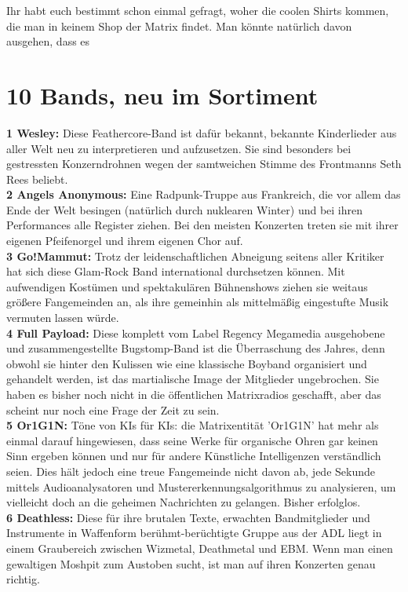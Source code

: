 \documentclass[9pt, final]{extarticle}
\begin{document}
\begin{multicols}{2}

Ihr habt euch bestimmt schon einmal gefragt, woher die coolen Shirts kommen, die man in keinem Shop der  Matrix findet. Man könnte natürlich davon ausgehen, dass es 
\section{10 Bands, neu im Sortiment}
\textbf{1 Wesley:} Diese Feathercore-Band ist dafür bekannt, bekannte Kinderlieder aus aller Welt neu zu interpretieren und aufzusetzen. Sie sind besonders bei gestressten Konzerndrohnen wegen der samtweichen Stimme des Frontmanns Seth Rees beliebt.\\
\textbf{2 Angels Anonymous:} Eine Radpunk-Truppe aus Frankreich, die vor allem  das Ende der Welt besingen (natürlich durch nuklearen Winter) und bei ihren Performances alle Register ziehen. Bei den meisten Konzerten treten sie mit ihrer eigenen Pfeifenorgel und ihrem eigenen Chor auf.\\
\textbf{3 Go!Mammut:} Trotz der leidenschaftlichen Abneigung seitens aller Kritiker hat sich diese Glam-Rock Band international durchsetzen können. Mit aufwendigen Kostümen und spektakulären Bühnenshows ziehen sie weitaus größere Fangemeinden an, als ihre gemeinhin als mittelmäßig eingestufte Musik vermuten lassen würde.\\
\textbf{4 Full Payload:} Diese komplett vom Label Regency Megamedia ausgehobene und zusammengestellte Bugstomp-Band ist die Überraschung des Jahres, denn obwohl sie hinter den Kulissen wie eine klassische Boyband organisiert und gehandelt werden, ist das martialische Image der Mitglieder ungebrochen. Sie haben es bisher noch nicht in die öffentlichen Matrixradios geschafft, aber das scheint nur noch eine Frage der Zeit zu sein.\\
\textbf{5 Or1G1N:} Töne von KIs für KIs: die Matrixentität 'Or1G1N' hat mehr als einmal darauf hingewiesen, dass seine Werke für organische Ohren gar keinen Sinn ergeben können und nur für andere Künstliche Intelligenzen verständlich seien. Dies hält jedoch eine treue Fangemeinde nicht davon ab, jede Sekunde mittels Audioanalysatoren und Mustererkennungsalgorithmus zu analysieren, um vielleicht doch an die geheimen Nachrichten zu gelangen. Bisher erfolglos.\\
\textbf{6 Deathless:} Diese für ihre brutalen Texte, erwachten Bandmitglieder und Instrumente in Waffenform berühmt-berüchtigte Gruppe aus der ADL liegt in einem Graubereich zwischen Wizmetal, Deathmetal und EBM. Wenn man einen gewaltigen Moshpit zum Austoben sucht, ist man auf ihren Konzerten genau richtig.\\

\end{multicols}
\end{document}
